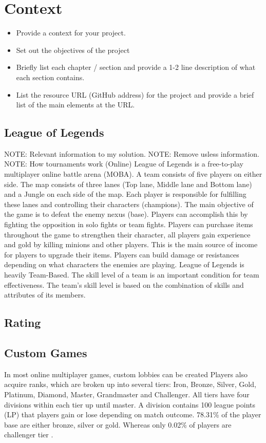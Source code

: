 \chapter{Context}
\begin{itemize}
	\item Provide a context for your project.
	\item Set out the objectives of the project
	\item Briefly list each chapter / section and provide a 1-2 line description of what each section contains.
	\item List the resource URL (GitHub address) for the project and provide a brief list of the main elements at the URL.
\end{itemize}

\section{League of Legends}
NOTE: Relevant information to my solution.
NOTE: Remove usless information.
NOTE: How tournaments work (Online)
League of Legends is a free-to-play multiplayer online battle arena (MOBA). A team consists of five players on either side. The map consists of three lanes (Top lane, Middle lane and Bottom lane) and a Jungle on each side of the map. Each player is responsible for fulfilling these lanes and controlling their characters (champions). The main objective of the game is to defeat the enemy nexus (base). Players can accomplish this by fighting the opposition in solo fights or team fights. Players can purchase items throughout the game to strengthen their character, all players gain experience and gold by killing minions and other players. This is the main source of income for players to upgrade their items. Players can build damage or resistances depending on what characters the enemies are playing.
League of Legends is heavily Team-Based. The skill level of a team is an important condition for team effectiveness. The team's skill level is based on the combination of skills and attributes of its members.

\section{Rating}
\section{Custom Games}
In most online multiplayer games, custom lobbies can be created 
Players also acquire ranks, which are broken up into several tiers: Iron, Bronze, Silver, Gold, Platinum, Diamond, Master, Grandmaster and Challenger. All tiers have four divisions within each tier up until master. A division contains 100 league points (LP) that players gain or lose depending on match outcome. 78.31\% of the player base are either bronze, silver or gold. Whereas only 0.02\% of players are challenger tier \cite{kou2016ranking}.


